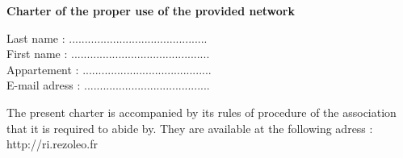 \documentclass[10pt]{article}
\begin{document}
\begin{center}
	{\huge \textbf{Charter of the proper use of the provided network}} \\
\end{center}

\vspace*{0.3cm}

\begin{flushright}

	Last name : ............................................\\
	First name : ............................................\\
	Appartement : .........................................\\
	E-mail adress : ........................................\\

\end{flushright}

\vspace*{0.5cm}


The present charter is accompanied by its rules of procedure of the association that it is required to
abide by. They are available at the following adress : http://ri.rezoleo.fr 

\vspace*{0.5cm}
\end{document}

